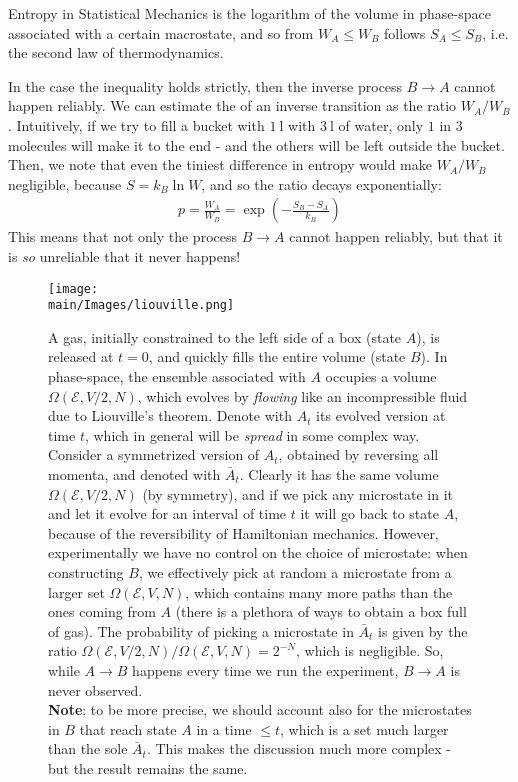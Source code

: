 \documentclass[../../main.tex]{subfiles}
\begin{document}
\medskip

Entropy in Statistical Mechanics is the logarithm of the volume in phase-space associated with a certain macrostate, and so from $W_A \leq W_B$ follows $S_A \leq S_B$, i.e. the second law of thermodynamics.

\medskip

In the case the inequality holds strictly, then the inverse process $B \to A$ cannot happen reliably. We can estimate the  of an inverse transition as the ratio $W_A/W_B$. Intuitively, if we try to fill a bucket with $\SI{1}{\l}$ with $\SI{3}{\l}$ of water, only $1$ in $3$ molecules will make it to the end - and the others will be left outside the bucket. Then, we note that even the tiniest difference in entropy would make $W_A/W_B$ negligible, because $S = k_B \ln W$, and so the ratio decays exponentially:
\begin{align*}
    p = \frac{W_A}{W_B} = \exp\left(-\frac{S_B - S_A}{k_B} \right) 
\end{align*}
This means that not only the process $B \to A$ cannot happen reliably, but that it is \textit{so} unreliable that it never happens!

\begin{figure}[H]
    \centering
    \texttt{[image: \\main/Images/liouville.png]}
    \caption{A gas, initially constrained to the left side of a box (state $A$), is released at $t=0$, and quickly fills the entire volume (state $B$). In phase-space, the ensemble associated with $A$ occupies a volume $\Omega(\mathcal{E}, V/2, N)$, which evolves by \textit{flowing} like an incompressible fluid due to Liouville's theorem. Denote with $A_t$ its evolved version at time $t$, which in general will be \textit{spread} in some complex way. Consider a symmetrized version of $A_t$, obtained by reversing all momenta, and denoted with $\bar{A}_t$. Clearly it has the same volume $\Omega(\mathcal{E}, V/2, N)$ (by symmetry), and if we pick any microstate in it and let it evolve for an interval of time $t$ it will go back to state $A$, because of the reversibility of Hamiltonian mechanics. However, experimentally we have no control on the choice of microstate: when constructing $B$, we effectively pick at random a microstate from a larger set $\Omega(\mathcal{E}, V, N)$, which contains many more paths than the ones coming from $A$ (there is a plethora of ways to obtain a box full of gas). The probability of picking a microstate in $\bar{A}_t$ is given by the ratio $\Omega(\mathcal{E}, V/2, N)/\Omega(\mathcal{E}, V, N) = 2^{-N}$, which is negligible. So, while $A \to B$ happens every time we run the experiment, $B \to A$ is never observed.\\\hspace{\textwidth}
    \textbf{Note}: to be more precise, we should account also for the microstates in $B$ that reach state $A$ in a time $\leq t$, which is a set much larger than the sole $\bar{A}_t$. This makes the discussion much more complex - but the result remains the same.}
    \label{fig:liouville-irreversibility}
\end{figure}
\end{document}
